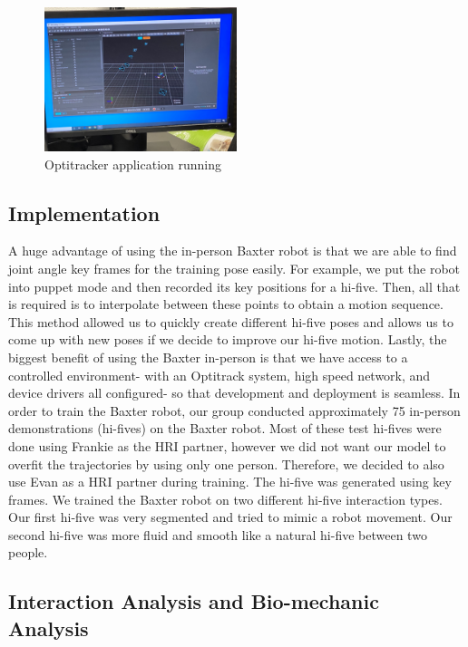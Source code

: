 \documentclass[letterpaper, 10 pt, conference]{ieeeconf}  %
\begin{document}
\begin{figure}[h]
\centering
\includegraphics[width=0.5\textwidth]{Optitracker.jpg}
\caption{Optitracker application running}
\end{figure}

\subsection{Implementation}
A huge advantage of using the in-person Baxter robot is that we are able to find joint angle key frames for the training pose easily. For example, we put the robot into puppet mode and then recorded its key positions for a hi-five. Then, all that is required is to interpolate between these points to obtain a motion sequence. This method allowed us to quickly create different hi-five poses and allows us to come up with new poses if we decide to improve our hi-five motion. Lastly, the biggest benefit of using the Baxter in-person is that we have access to a controlled environment- with an Optitrack system, high speed network, and device drivers all configured- so that development and deployment is seamless.
\newline
\indent In order to train the Baxter robot, our group conducted approximately 75 in-person demonstrations (hi-fives) on the Baxter robot. Most of these test hi-fives were done using Frankie as the HRI partner, however we did not want our model to overfit the trajectories by using only one person. Therefore, we decided to also use Evan as a HRI partner during training. The hi-five was generated using key frames. We trained the Baxter robot on two different hi-five interaction types. Our first hi-five was very segmented and tried to mimic a robot movement. Our second hi-five was more fluid and smooth like a natural hi-five between two people. 

\subsection{Interaction Analysis and Bio-mechanic Analysis}
\end{document}
